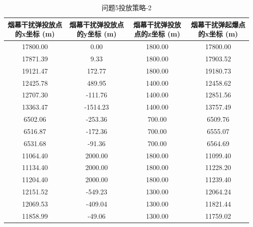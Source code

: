 \documentclass[../main.tex]{subfiles}
\begin{document}
\begin{table}[H]
\caption{问题5投放策略-2}
\label{tab:....031} 
\centering
\begin{scriptsize}
\begin{tabular}{cccc}
\toprule[1.5pt]
烟幕干扰弹投放点的x坐标 (m) & 烟幕干扰弹投放点的y坐标 (m) & 烟幕干扰弹投放点的z坐标 (m) & 烟幕干扰弹起爆点的x坐标 (m) \\
\midrule[1pt]
17800.00 & 0.00  & 1800.00 & 17800.00 \\  %
17871.39 & 9.33  & 1800.00 & 17903.52 \\  %
19121.47 & 172.77& 1800.00 & 19180.73 \\  %
12425.78 & 489.95& 1400.00 & 12458.62 \\  %
12707.30 & -111.76&1400.00 & 12851.56 \\  %
13363.47 & -1514.23&1400.00& 13757.49 \\  %
6502.06  & -253.36&700.00  & 6509.76  \\  %
6516.87  & -172.36&700.00  & 6555.07  \\  %
6531.68  & -91.36 &700.00  & 6564.69  \\  %
11064.40 & 2000.00&1800.00 & 11099.40 \\  %
11134.40 & 2000.00&1800.00 & 11228.20 \\  %
11204.40 & 2000.00&1800.00 & 11239.40 \\  %
12151.52 & -549.23&1300.00 & 12064.24 \\  %
12069.53 & -409.04&1300.00 & 11821.44 \\  %
11858.99 & -49.06 &1300.00 & 11759.02 \\  %
\bottomrule[1.5pt]
\end{tabular}
\end{scriptsize}
\end{table}
\end{document}
